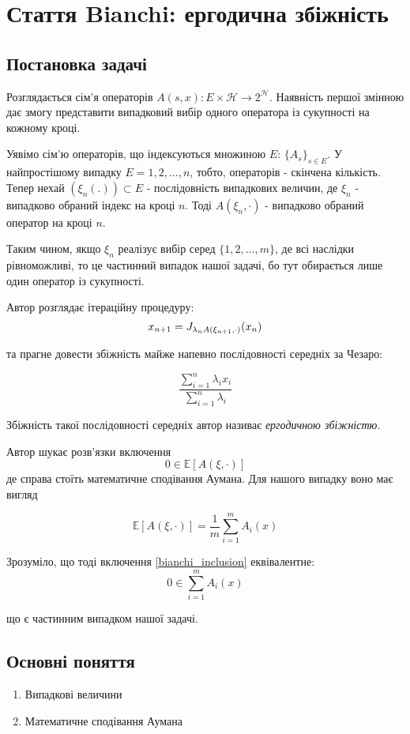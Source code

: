 \documentclass[main.tex]{subfile}
\begin{document}
	\section{Стаття Bianchi: ергодична збіжність}
	\subsection{Постановка задачі}
	Розглядається сім'я операторів $A(s, x): E \times \mathcal{H} \rightarrow 2^\mathcal{H} $. Наявність першої змінною дає змогу представити випадковий вибір одного оператора із сукупності на кожному кроці.
	
	Уявімо сім'ю операторів, що індексуються множиною $E$: $\{ A_{s} \}_{s \in E}$. У найпростішому випадку $E = {1, 2, \ldots, n}$, тобто, операторів - скінчена кількість. Тепер нехай $(\xi_n(.)) \subset E$ - послідовність випадкових величин, де $\xi_n$ - випадково обраний індекс на кроці $n$. Тоді $A(\xi_n, \cdot)$ - випадково обраний оператор на кроці $n$.
	
	Таким чином, якщо $\xi_n$  реалізує вибір серед $\{1, 2, \ldots, m\}$, де всі наслідки рівноможливі, то це частинний випадок нашої задачі, бо тут обирається лише один оператор із сукупності. 
	
	
	Автор розглядає ітераційну процедуру:
	\begin{equation}
		x_{n+1} = J_{\lambda_nA(\xi_{n+1}, \cdot)}(x_n)
		\label{bianchi_iter}
	\end{equation}

	
	та прагне довести збіжність майже напевно послідовності середніх за Чезаро:
	
	\[ 		\frac{\sum_{i=1}^{n} \lambda_i x_i}{\sum_{i=1}^{n} \lambda_i}   \]
	
	Збіжність такої послідовності середніх автор називає {\itshape ергодичною збіжністю}.
	
	Автор шукає розв'язки включення 
\begin{equation}
	0 \in \mathbb{E}[ A(\xi, \cdot) ] 
	\label{bianchi_inclusion}
\end{equation} де справа стоїть математичне сподівання Аумана. Для нашого випадку воно має вигляд
	
	\[ \mathbb{E}[ A(\xi, \cdot)] = \frac{1}{m}\sum_{i=1}^{m} A_i(x)\]
	
	Зрозуміло, що тоді включення  \ref{bianchi_inclusion} еквівалентне:
	\[ 0 \in \sum_{i=1}^{m} A_i(x)\]
	
	що є частинним випадком нашої задачі.
	\subsection{Основні поняття}
	\begin{enumerate}
		\item Випадкові величини 
		\item Математичне сподівання Аумана
	\end{enumerate}
\end{document}
